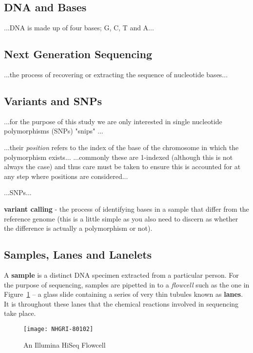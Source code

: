 \subsection{DNA and Bases}

...DNA is made up of four bases; G, C, T and A...


\subsection{Next Generation Sequencing}

...the process of recovering or extracting the sequence of nucleotide bases...


\subsection{Variants and SNPs}
...for the purpose of this study we are only interested in single nucleotide
polymorphisms (SNPs) "snips" ...

...their \textit{position} refers to the index of the base of the chromosome in
which the polymorphism exists...
...commonly these are 1-indexed (although this is not always the case) and thus
care must be taken to ensure this is accounted for at any step where positions
are considered...

...SNPs...

\textbf{variant calling} - the process of identifying bases in a sample that
differ from the reference genome (this is a little simple as you also need to
discern as whether the difference is actually a polymorphism or not).



\subsection{Samples, Lanes and Lanelets}
\label{chap:samplelanelanelets}

A \textbf{sample} is a distinct DNA specimen extracted from a particular person.
For the purpose of sequencing, samples are pipetted in to a \textit{flowcell}
such as the one in Figure~\ref{fig:flowcell} -- a glass slide
containing a series of very thin tubules known as \textbf{lanes}.  It is
throughout these lanes that the chemical reactions involved in sequencing take place.

\begin{figure}[htbp!]
    \centering
    \texttt{[image: NHGRI-80102]}
    \caption[flowcell]{An Illumina HiSeq Flowcell\citep{img:flowcell}}
    \label{fig:flowcell}
\end{figure}

